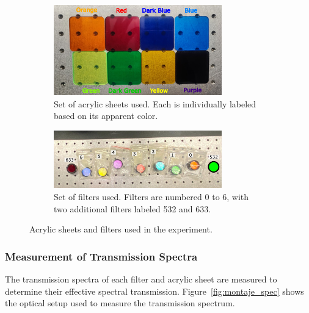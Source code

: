 \begin{figure}[h!]
    \centering
    \begin{subfigure}{\textwidth}
        \centering
        \includegraphics[width=0.8\textwidth]{Figures/C3/laminas.pdf}
        \caption{Set of acrylic sheets used. Each is individually labeled based on its apparent color.}
        \label{fig:laminas}
    \end{subfigure}
    \vspace{1em}
    \begin{subfigure}{\textwidth}
        \centering
        \includegraphics[width=0.8\textwidth]{Figures/C3/filtros.pdf}
        \caption{Set of filters used. Filters are numbered 0 to 6, with two additional filters labeled 532 and 633.}
        \label{fig:filtros}
    \end{subfigure}
    \caption{Acrylic sheets and filters used in the experiment.}
    \label{fig:laminas_filtros}
\end{figure}

\subsubsection{Measurement of Transmission Spectra}
\label{subsub:medicion_transmision}

The transmission spectra of each filter and acrylic sheet are measured to determine their effective spectral transmission. Figure~\ref{fig:montaje_spec} shows the optical setup used to measure the transmission spectrum.

